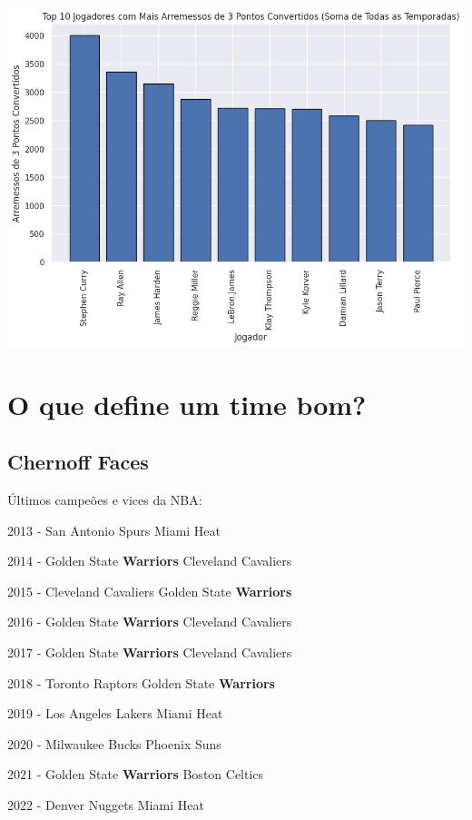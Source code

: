 \documentclass[
]{book}
\begin{document}
\includegraphics{imagens/19.png}

\hypertarget{o-que-define-um-time-bom}{%
\chapter{O que define um time bom?}\label{o-que-define-um-time-bom}}

\hypertarget{chernoff-faces}{%
\section{Chernoff Faces}\label{chernoff-faces}}

Últimos campeões e vices da NBA:

2013 - San Antonio Spurs \textbar{} Miami Heat

2014 - Golden State \textbf{Warriors} \textbar{} Cleveland Cavaliers

2015 - Cleveland Cavaliers \textbar{} Golden State \textbf{Warriors}

2016 - Golden State \textbf{Warriors} \textbar{} Cleveland Cavaliers

2017 - Golden State \textbf{Warriors} \textbar{} Cleveland Cavaliers

2018 - Toronto Raptors \textbar{} Golden State \textbf{Warriors}

2019 - Los Angeles Lakers \textbar{} Miami Heat

2020 - Milwaukee Bucks \textbar{} Phoenix Suns

2021 - Golden State \textbf{Warriors} \textbar{} Boston Celtics

2022 - Denver Nuggets \textbar{} Miami Heat
\end{document}
